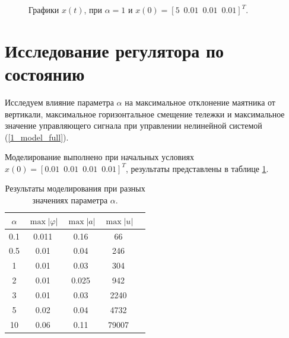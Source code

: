 \begin{figure}[!h]
\caption{Графики $x(t)$, при $\alpha = 1$ и $x(0) = [5\, \, \,  0.01\, \, \, 0.01\, \, \, 0.01]^T$.}
\label{4_1_5}
\end{figure}

\section{Исследование регулятора по состоянию}

Исследуем влияние параметра $\alpha$ на максимальное отклонение маятника от вертикали, максимальное горизонтальное смещение тележки и максимальное значение управляющего сигнала при управлении нелинейной системой (\ref{1_model_full}).

 Моделирование выполнено при начальных условиях $x(0) = [0.01\, \, \,  0.01\, \, \, 0.01\, \, \, 0.01]^T$, результаты представлены в таблице \ref{4_tab_2}.


\begin{table}[h]
\centering
\caption{Результаты моделирования при разных значениях параметра $\alpha$.}
\label{4_tab_2}
\begin{tabular}{ccccc}
\toprule
$\alpha$ & $\max |\varphi|$ & $\max |a|$ & $\max |u|$ \\
\midrule
0.1  &  0.011  &  0.16  &  66  \\
0.5  &  0.01  &  0.04  &  246  \\
1 &  0.01  &  0.03  &  304  \\
2  &  0.01  &  0.025 &  942  \\
3  &  0.01  &  0.03 &  2240  \\
5  &  0.02  &  0.04 &  4732  \\
10  &  0.06  &  0.11 &  79007  \\
\bottomrule
\end{tabular}
\end{table}


